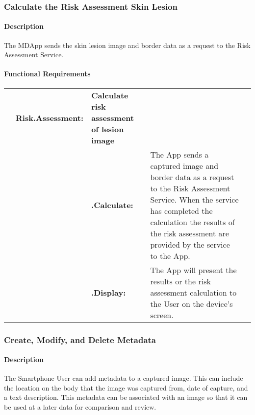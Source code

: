 {        \subsubsection{Calculate the Risk Assessment Skin Lesion}

            \paragraph{Description}

            The MDApp sends the skin lesion image and border data as a request to the Risk Assessment Service.

            \paragraph{Functional Requirements}
                \begin{longtable}[H]{ >{\bfseries}l >{\bfseries}l >{\bfseries}l p{8.5cm} l }

                    \hline
                    & \multicolumn{2}{>{\bfseries}l}
                    {Risk.Assessment:} & \textbf{Calculate risk assessment of lesion image}  \\

                    & & .Calculate: &
                    The App sends a captured image and border data as a request to the Risk Assessment Service. When the service has completed the calculation the results of the risk assessment are provided by the service to the App.
                    \\

                    & & .Display: &
                    The App will present the results or the risk assessment calculation to the User on the device’s screen.
                    \\
                    \hline
                \end{longtable}


        \subsubsection{Create, Modify, and Delete Metadata}

            \paragraph{Description}

            The Smartphone User can add metadata to a captured image. This can include the location on the body that the image was captured from, date of capture, and a text description. This metadata can be associated with an image so that it can be used at a later data for comparison and review.

}
